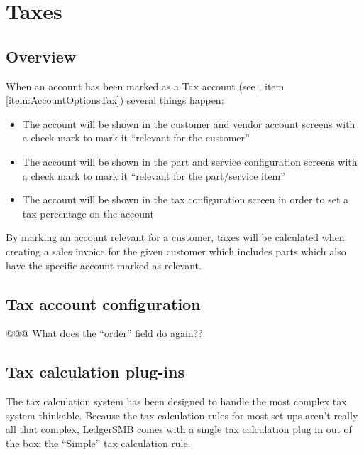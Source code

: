 \chapter{Taxes}
\label{cha:Taxes}

\section{Overview}

When an account has been marked as a Tax account (see , item
\ref{item:AccountOptionsTax}) several things happen:

\begin{itemize}
\item The account will be shown in the customer and vendor account screens with
   a check mark to mark it ``relevant for the customer''
\item The account will be shown in the part and service configuration screens
   with a check mark to mark it ``relevant for the part/service item''
\item The account will be shown in the tax configuration screen in order to set
   a tax percentage on the account
\end{itemize}

By marking an account relevant for a customer, taxes will be calculated when
creating a sales invoice for the given customer which includes parts which also
have the specific account marked as relevant.

\section{Tax account configuration}

@@@ What does the ``order'' field do again??

\section{Tax calculation plug-ins}
\label{sec:TaxRulePlugins}

The tax calculation system has been designed to handle the most complex tax system
thinkable. Because the tax calculation rules for most set ups aren't really all that
complex, LedgerSMB comes with a single tax calculation plug in out of the box: the
``Simple'' tax calculation rule.

